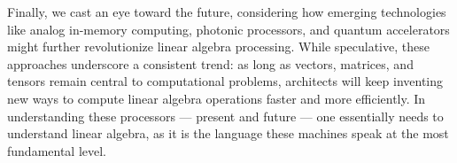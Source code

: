 Finally, we cast an eye toward the future, considering how emerging technologies like analog in-memory computing, photonic processors, and quantum accelerators might further revolutionize linear algebra processing. While speculative, these approaches underscore a consistent trend: as long as vectors, matrices, and tensors remain central to computational problems, architects will keep inventing new ways to compute linear algebra operations faster and more efficiently. In understanding these processors — present and future — one essentially needs to understand linear algebra, as it is the language these machines speak at the most fundamental level.